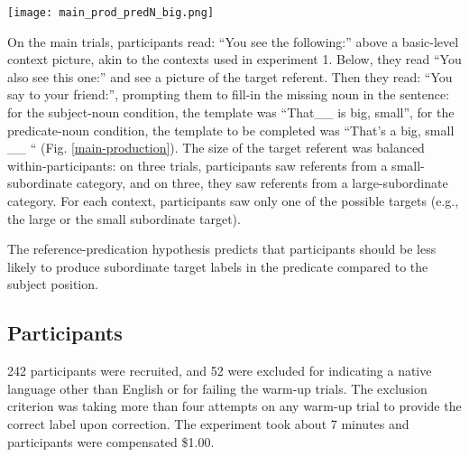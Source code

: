 \begin{figure*}[t]
	\begin{center}
		\texttt{[image: main\_prod\_predN\_big.png]}
	\end{center}
	\caption{Example view of the noun production main trial: Participants fill-in the noun in the predicate position of a sentence describing a large-subordinate target.}
	\label{main-production}
\end{figure*}
On the main trials, participants read: “You see the following:” above a basic-level context picture, akin to the contexts used in experiment 1. Below, they read “You also see this one:” and see a picture of the target referent. Then they read: “You say to your friend:”, prompting them to fill-in the missing noun in the sentence: for the subject-noun condition, the template was “That\_\_ is {big, small}”, for the predicate-noun condition, the template to be completed was “That’s a {big, small} \_\_ “ (Fig. \ref{main-production}).  
The size of the target referent was balanced within-participants: on three trials, participants saw referents from a small-subordinate category, and on three, they saw referents from a large-subordinate category. For each context, participants saw only one of the possible targets (e.g., the large or the small subordinate target).

The reference-predication hypothesis predicts that participants should be less likely to produce subordinate target labels in the predicate compared to the subject position.

\subsection{Participants}
242 participants were recruited, and 52 were excluded for indicating a native language other than English or for failing the warm-up trials. The exclusion criterion was taking more than four attempts on any warm-up trial to provide the correct label upon correction. The experiment took about 7 minutes and participants were compensated \$1.00. 
 
